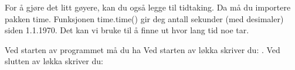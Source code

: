 %
%
For å gjøre det litt gøyere, kan du også legge til tidtaking.
Da må du importere pakken time.
Funksjonen time.time() gir deg antall sekunder (med desimaler) siden 1.1.1970.
Det kan vi bruke til å finne ut hvor lang tid noe tar.

Ved starten av programmet må du ha  Ved starten av løkka skriver du: . Ved slutten av løkka skriver du:
